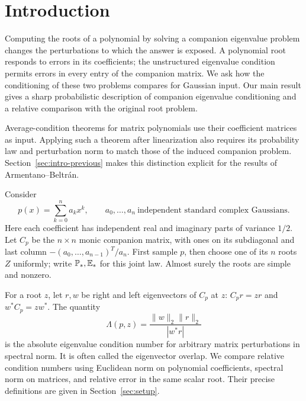 \section{Introduction}\label{sec:introduction}

Computing the roots of a polynomial by solving a companion eigenvalue problem
changes the perturbations to which the answer is exposed. A polynomial root
responds to errors in its coefficients; the unstructured eigenvalue condition
permits errors in every entry of the companion matrix. We ask how the conditioning of these two problems
compares for Gaussian input. Our main result gives a sharp probabilistic
description of companion eigenvalue conditioning and a relative comparison
with the original root problem.

Average-condition theorems for matrix polynomials use their coefficient
matrices as input. Applying such a theorem after linearization also requires
its probability law and perturbation norm to match those of the induced
companion problem. Section~\ref{sec:intro-previous} makes this distinction
explicit for the results of Armentano--Beltr\'an.

Consider
\[
 p(x)=\sum_{k=0}^n a_kx^k,
 \qquad a_0,\ldots,a_n\ \text{independent standard complex Gaussians}.
\]
Here each coefficient has independent real and imaginary parts of variance
$1/2$. Let $C_p$ be the $n\times n$ monic companion matrix, with ones on its
subdiagonal and last column $-(a_0,\ldots,a_{n-1})^T/a_n$. First sample $p$,
then choose one of its $n$ roots $Z$ uniformly; write $\mathbb P_*,\mathbb E_*$ for this
joint law. Almost surely the roots are simple and nonzero.

For a root $z$, let $r,w$ be right and left eigenvectors of $C_p$ at $z$:
$C_pr=zr$ and $w^*C_p=zw^*$. The quantity
\begin{equation}\label{eq:intro-overlap}
 \Lambda(p,z)=\frac{\|w\|_2\|r\|_2}{|w^*r|}
\end{equation}
is the absolute eigenvalue condition number for arbitrary matrix perturbations
in spectral norm. It is often called the eigenvector overlap. We compare
relative condition numbers using Euclidean norm on polynomial coefficients,
spectral norm on matrices, and relative error in the same scalar root. Their
precise definitions are given in Section~\ref{sec:setup}.

